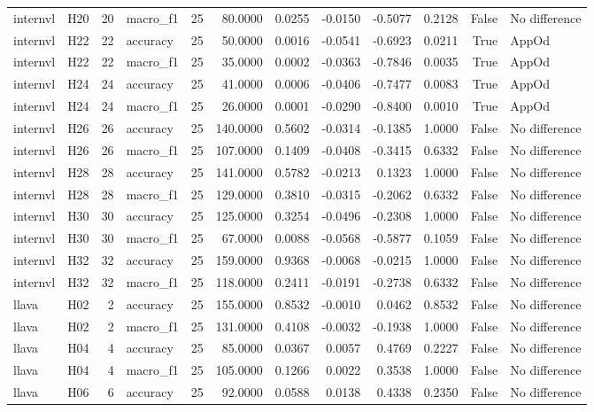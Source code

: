 \begin{table}[tbp]
\begin{tabular}{llrlrrrrrrrl}
internvl & H20 & 20 & macro\_f1 & 25 & 80.0000 & 0.0255 & -0.0150 & -0.5077 & 0.2128 & False & No difference \\
internvl & H22 & 22 & accuracy & 25 & 50.0000 & 0.0016 & -0.0541 & -0.6923 & 0.0211 & True & AppOd \\
internvl & H22 & 22 & macro\_f1 & 25 & 35.0000 & 0.0002 & -0.0363 & -0.7846 & 0.0035 & True & AppOd \\
internvl & H24 & 24 & accuracy & 25 & 41.0000 & 0.0006 & -0.0406 & -0.7477 & 0.0083 & True & AppOd \\
internvl & H24 & 24 & macro\_f1 & 25 & 26.0000 & 0.0001 & -0.0290 & -0.8400 & 0.0010 & True & AppOd \\
internvl & H26 & 26 & accuracy & 25 & 140.0000 & 0.5602 & -0.0314 & -0.1385 & 1.0000 & False & No difference \\
internvl & H26 & 26 & macro\_f1 & 25 & 107.0000 & 0.1409 & -0.0408 & -0.3415 & 0.6332 & False & No difference \\
internvl & H28 & 28 & accuracy & 25 & 141.0000 & 0.5782 & -0.0213 & 0.1323 & 1.0000 & False & No difference \\
internvl & H28 & 28 & macro\_f1 & 25 & 129.0000 & 0.3810 & -0.0315 & -0.2062 & 0.6332 & False & No difference \\
internvl & H30 & 30 & accuracy & 25 & 125.0000 & 0.3254 & -0.0496 & -0.2308 & 1.0000 & False & No difference \\
internvl & H30 & 30 & macro\_f1 & 25 & 67.0000 & 0.0088 & -0.0568 & -0.5877 & 0.1059 & False & No difference \\
internvl & H32 & 32 & accuracy & 25 & 159.0000 & 0.9368 & -0.0068 & -0.0215 & 1.0000 & False & No difference \\
internvl & H32 & 32 & macro\_f1 & 25 & 118.0000 & 0.2411 & -0.0191 & -0.2738 & 0.6332 & False & No difference \\
llava & H02 & 2 & accuracy & 25 & 155.0000 & 0.8532 & -0.0010 & 0.0462 & 0.8532 & False & No difference \\
llava & H02 & 2 & macro\_f1 & 25 & 131.0000 & 0.4108 & -0.0032 & -0.1938 & 1.0000 & False & No difference \\
llava & H04 & 4 & accuracy & 25 & 85.0000 & 0.0367 & 0.0057 & 0.4769 & 0.2227 & False & No difference \\
llava & H04 & 4 & macro\_f1 & 25 & 105.0000 & 0.1266 & 0.0022 & 0.3538 & 1.0000 & False & No difference \\
llava & H06 & 6 & accuracy & 25 & 92.0000 & 0.0588 & 0.0138 & 0.4338 & 0.2350 & False & No difference \\

\end{tabular}
\end{table}
